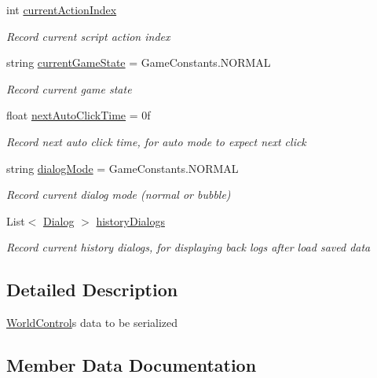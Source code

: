 \begin{DoxyCompactItemize}
int \hyperlink{class_world_control_data_aa328aa4550803945ce301ef201145438}{current\+Action\+Index}
\begin{DoxyCompactList}\small\item\em Record current script action index \end{DoxyCompactList}\item 
string \hyperlink{class_world_control_data_a69e2970295be1f325197b658c9a3eee2}{current\+Game\+State} = Game\+Constants.\+N\+O\+R\+M\+AL
\begin{DoxyCompactList}\small\item\em Record current game state \end{DoxyCompactList}\item 
float \hyperlink{class_world_control_data_a7a50bd56671a90d950c4c74ea322adca}{next\+Auto\+Click\+Time} = 0f
\begin{DoxyCompactList}\small\item\em Record next auto click time, for auto mode to expect next click \end{DoxyCompactList}\item 
string \hyperlink{class_world_control_data_a6c7b437771b35a8ebd28d36956ec3617}{dialog\+Mode} = Game\+Constants.\+N\+O\+R\+M\+AL
\begin{DoxyCompactList}\small\item\em Record current dialog mode (normal or bubble) \end{DoxyCompactList}\item 
List$<$ \hyperlink{class_dialog}{Dialog} $>$ \hyperlink{class_world_control_data_a929b204522d67946285280d97798fee1}{history\+Dialogs}
\begin{DoxyCompactList}\small\item\em Record current history dialogs, for displaying back logs after load saved data \end{DoxyCompactList}\end{DoxyCompactItemize}


\subsection{Detailed Description}
\hyperlink{class_world_control}{World\+Control}\textquotesingle{}s data to be serialized 



\subsection{Member Data Documentation}
